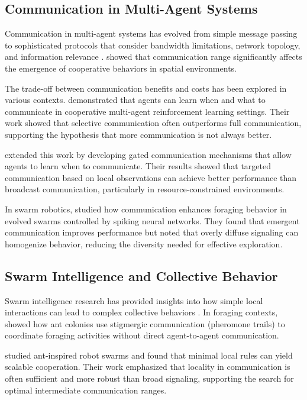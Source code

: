 \documentclass[12pt,a4paper]{article}
\begin{document}
\subsection{Communication in Multi-Agent Systems}

Communication in multi-agent systems has evolved from simple message passing to sophisticated protocols that consider bandwidth limitations, network topology, and information relevance \parencite{finin1994kqml, labrou1997agent}. \textcite{goldman2003netlogo} showed that communication range significantly affects the emergence of cooperative behaviors in spatial environments.

The trade-off between communication benefits and costs has been explored in various contexts. \textcite{foerster2016learning} demonstrated that agents can learn when and what to communicate in cooperative multi-agent reinforcement learning settings. Their work showed that selective communication often outperforms full communication, supporting the hypothesis that more communication is not always better.

\textcite{singh2019ic3net} extended this work by developing gated communication mechanisms that allow agents to learn when to communicate. Their results showed that targeted communication based on local observations can achieve better performance than broadcast communication, particularly in resource-constrained environments.

In swarm robotics, \textcite{jimenez2023emergent} studied how communication enhances foraging behavior in evolved swarms controlled by spiking neural networks. They found that emergent communication improves performance but noted that overly diffuse signaling can homogenize behavior, reducing the diversity needed for effective exploration.

\subsection{Swarm Intelligence and Collective Behavior}

Swarm intelligence research has provided insights into how simple local interactions can lead to complex collective behaviors \parencite{bonabeau1999swarm, kennedy2001swarm}. In foraging contexts, \textcite{deneubourg1990self} showed how ant colonies use stigmergic communication (pheromone trails) to coordinate foraging activities without direct agent-to-agent communication.

\textcite{hecker2015beyond} studied ant-inspired robot swarms and found that minimal local rules can yield scalable cooperation. Their work emphasized that locality in communication is often sufficient and more robust than broad signaling, supporting the search for optimal intermediate communication ranges.
\end{document}
